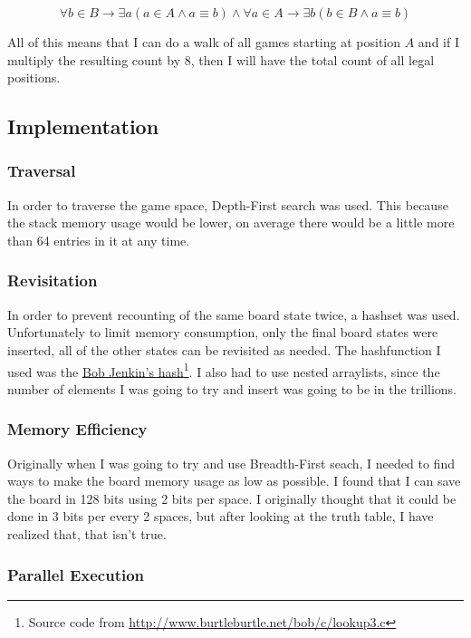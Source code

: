 \documentclass{article}
\newcommand{\AND}{\mbox{$\wedge$}}						%
\begin{document}
	$$\forall b\in B \rightarrow\exists a(a\in A\AND a\equiv b)\AND\forall a\in A \rightarrow\exists b(b\in B\AND a\equiv b)$$

All of this means that I can do a walk of all games starting at position $A$ and if I multiply the resulting count by 8, then I will have the total count of all legal positions.

\subsection{Implementation}

\subsubsection{Traversal}

In order to traverse the game space, Depth-First search was used. This because the stack memory usage would be lower, on average there would be a little more than 64 entries in it at any time. 

\subsubsection{Revisitation}

In order to prevent recounting of the same board state twice, a hashset was used. Unfortunately to limit memory consumption, only the final board states were inserted, all of the other states can be revisited as needed. The hashfunction I used was the \href{https://en.wikipedia.org/wiki/Jenkins_hash_function}{Bob Jenkin's hash}\footnote{Source code from \url{http://www.burtleburtle.net/bob/c/lookup3.c}}. I also had to use nested arraylists, since the number of elements I was going to try and insert was going to be in the trillions. 

\subsubsection{Memory Efficiency}

Originally when I was going to try and use Breadth-First seach, I needed to find ways to make the board memory usage as low as possible. I found that I can save the board in 128 bits using 2 bits per space. I originally thought that it could be done in 3 bits per every 2 spaces, but after looking at the truth table, I have realized that, that isn't true.


\subsubsection{Parallel Execution}
\end{document}
